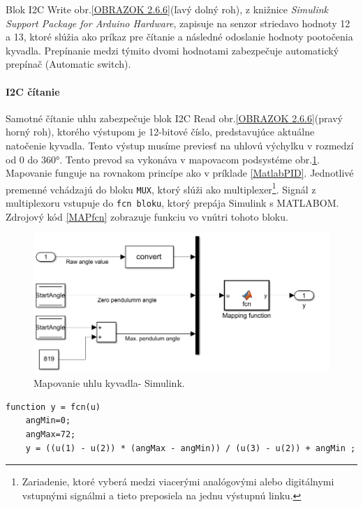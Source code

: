 Blok I2C Write obr.\ref{OBRAZOK 2.6.6}(ľavý dolný roh), z knižnice \textit{Simulink Support Package for Arduino Hardware}, zapisuje na senzor striedavo hodnoty 12 a 13, ktoré slúžia ako príkaz pre čítanie a následné odoslanie hodnoty pootočenia kyvadla. Prepínanie medzi týmito dvomi hodnotami zabezpečuje automatický prepínač (Automatic switch). 

\paragraph{I2C čítanie}

Samotné čítanie uhlu zabezpečuje blok I2C Read obr.\ref{OBRAZOK 2.6.6}(pravý horný roh), ktorého výstupom je 12-bitové číslo, predstavujúce aktuálne natočenie kyvadla. Tento výstup musíme previesť na uhlovú výchylku v rozmedzí od 0 do 360°. Tento prevod sa vykonáva v mapovacom podsystéme obr.\ref{OBRAZOK 2.6.7}. Mapovanie funguje na rovnakom princípe ako v príklade \ref{MatlabPID}. Jednotlivé premenné vchádzajú do bloku \verb*|MUX|, ktorý slúži ako multiplexer\footnote[9]{Zariadenie, ktoré vyberá medzi viacerými analógovými alebo digitálnymi vstupnými signálmi a tieto preposiela na jednu výstupnú linku.}. Signál z multiplexoru vstupuje do \verb|fcn bloku|, ktorý prepája Simulink s MATLABOM. Zdrojový kód \ref{MAPfcn} zobrazuje funkciu vo vnútri tohoto bloku. 


\begin{figure}[!tbh]
	\centering
	\includegraphics[width=\textwidth]{obr/SensMap.png}
	\caption{Mapovanie uhlu kyvadla- Simulink.}\label{OBRAZOK 2.6.7}
\end{figure}


\begin{lstlisting}[caption={Mapovacia funkcia vo fcn bloku.},captionpos=b,label=MAPfcn]
	function y = fcn(u)
	angMin=0;
	angMax=72;
	y = ((u(1) - u(2)) * (angMax - angMin)) / (u(3) - u(2)) + angMin ;
\end{lstlisting}


